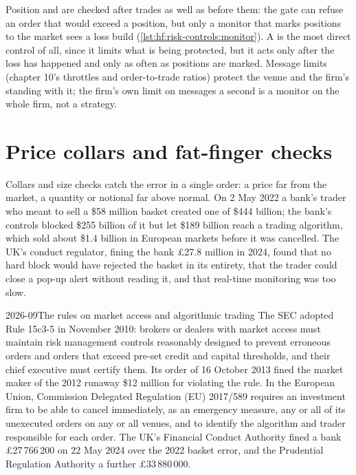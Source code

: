 Position and  are checked after trades as well as before them: the gate can refuse an order that would exceed a position, but only a
monitor that marks positions to the market sees a loss build (\cref{lst:hf:risk-controls:monitor}). A  is the most direct control of all,
since it limits what is being protected, but it acts only after the loss has happened and only as often as positions are marked. Message limits
(chapter 10's throttles and order-to-trade ratios) protect the venue and the firm's standing with it; the firm's own limit on messages a second is a
monitor on the whole firm, not a strategy.

\section{Price collars and fat-finger checks}

Collars and size checks catch the error in a single order: a price far from the market, a quantity or notional far above normal. On 2 May 2022 a
bank's trader who meant to sell a \$58 million basket created one of \$444 billion; the bank's controls blocked \$255 billion of it but let \$189
billion reach a trading algorithm, which sold about \$1.4 billion in European markets before it was cancelled. The UK's conduct regulator, fining
the bank £27.8 million in 2024, found that no hard block would have rejected the basket in its entirety, that the trader could close a pop-up alert
without reading it, and that real-time monitoring was too slow.

\begin{dated}{2026-09}{The rules on market access and algorithmic trading}\label{dat:hf:risk-controls:rules}
The SEC adopted Rule 15c3-5 in November 2010: brokers or dealers with market access must maintain risk management controls reasonably designed
to prevent erroneous orders and orders that exceed pre-set credit and capital thresholds, and their chief executive must certify them. Its order of
16 October 2013 fined the market maker of the 2012 runaway \$12 million for violating the rule. In the European Union, Commission Delegated
Regulation (EU) 2017/589 requires an investment firm to be able to cancel immediately, as an emergency measure, any or all of its unexecuted orders
on any or all venues, and to identify the algorithm and trader responsible for each order. The UK's Financial Conduct Authority fined a bank
£27\,766\,200 on 22 May 2024 over the 2022 basket error, and the Prudential Regulation Authority a further £33\,880\,000.
\end{dated}

